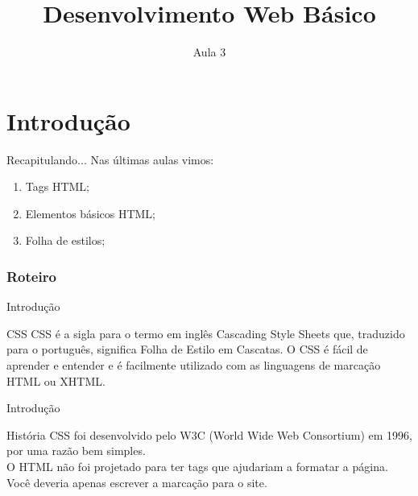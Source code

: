 \documentclass{beamer}
\title{Desenvolvimento Web Básico}
\subtitle{Aula 3}
\date{}
\begin{document}
\frame{
 \titlepage
}

\section{Introdução}
\begin{frame}{Recapitulando...}
Nas últimas aulas vimos:
  \begin{enumerate}
   \item Tags HTML;
   \item Elementos básicos HTML;
   \item Folha de estilos;
  \end{enumerate}
\end{frame}
\begin{frame}
\frametitle{Roteiro} %
\tableofcontents %
\end{frame}
\begin{frame}{Introdução}
\begin{block}{CSS}
CSS é a sigla para o termo em inglês Cascading Style Sheets que, traduzido para o português, significa Folha de Estilo em Cascatas. O CSS é fácil de aprender e entender e é facilmente utilizado com as linguagens de marcação HTML ou XHTML. 
\end{block}
\end{frame}
\begin{frame}{Introdução}
\begin{block}{História}
CSS foi desenvolvido pelo W3C (World Wide Web Consortium) em 1996, por uma razão bem simples. \\
O HTML não foi projetado para ter tags que ajudariam a formatar a página. \\
Você deveria apenas escrever a marcação para o site.
\end{block}
\end{frame}
\end{document}
